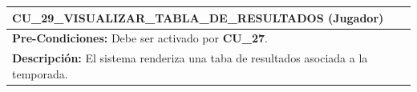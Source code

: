 \begin{center}
  \begin{tabular}{| p{7.5cm} | p{7.5cm} |}
    \hline
    \multicolumn{2}{|p{15cm}|}{\textbf{CU\_29\_VISUALIZAR\_TABLA\_DE\_RESULTADOS} (Jugador)} \\ \hline
    \multicolumn{2}{|p{15cm}|}{\textbf{Pre-Condiciones:} Debe ser activado por \textbf{CU\_27}.} \\ \hline
    \multicolumn{2}{|p{15cm}|}{\textbf{Descripción:} El sistema renderiza una taba de resultados asociada a la temporada.} \\
    \hline
  \end{tabular}
  
  \label{table:usecase:29}
\end{center}


